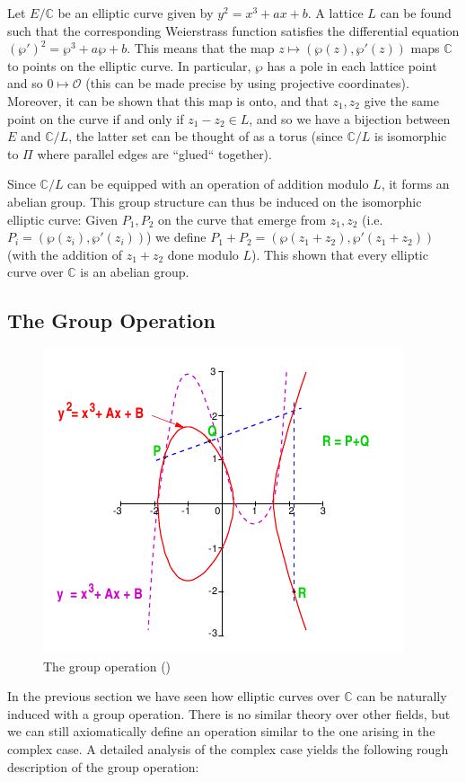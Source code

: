 \documentclass[11pt,english]{article}
\begin{document}
Let $E/\mathbb{C}$ be an elliptic curve given by $y^2=x^3+ax+b$. A lattice $L$ can be found such that the corresponding Weierstrass function satisfies the differential equation
$(\wp')^2=\wp^3+a\wp+b$. This means that the map $z\mapsto (\wp(z),\wp'(z))$ maps $\mathbb{C}$ to points on the elliptic curve. In particular, $\wp$
has a pole in each lattice point and so $0\mapsto \mathcal{O}$ (this can be made precise by using projective coordinates). Moreover, it
can be shown that this map is onto, and that $z_1,z_2$ give the same point on the curve if and only if $z_1-z_2\in L$, and so we have a bijection
between $E$  and $\mathbb{C}/L$, the latter set can be thought of as a torus (since $\mathbb{C}/L$ is isomorphic to $\Pi$ where parallel edges are ``glued`` together).

Since $\mathbb{C}/L$ can be equipped with an operation of addition modulo $L$, it forms an abelian group. This group structure can thus be induced on the 
isomorphic elliptic curve: Given $P_1, P_2$ on the curve that emerge from $z_1,z_2$ (i.e. $P_i=(\wp(z_i),\wp'(z_i))$) we define $P_1+P_2=(\wp(z_1+z_2),\wp'(z_1+z_2))$ 
(with the addition of $z_1+z_2$ done modulo $L$). This shown that every elliptic curve over $\mathbb{C}$ is an abelian group.
\subsection{The Group Operation}
\begin{figure}
   \centering
   \includegraphics[scale = 0.5]{ecaddition.png}
   \caption{The group operation (\cite{maurerscript})}
\end{figure}
In the previous section we have seen how elliptic curves over $\mathbb{C}$ can be naturally induced with a group operation. There is no similar theory over
other fields, but we can still axiomatically define an operation similar to the one arising in the complex case. A detailed analysis of the complex case yields
the following rough description of the group operation:
\end{document}
